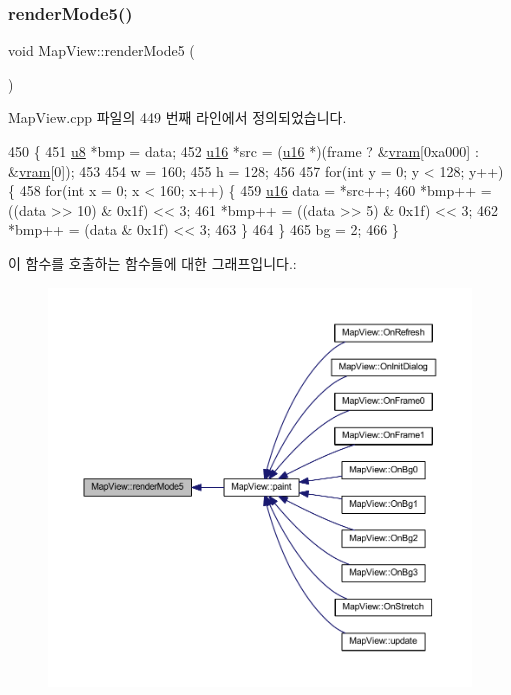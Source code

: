 \mbox{\label{class_map_view_a8f6282ba1ec4a295b2fb33a41e541ba1}} 
\subsubsection{\texorpdfstring{render\+Mode5()}{renderMode5()}}
{\footnotesize\ttfamily void Map\+View\+::render\+Mode5 (\begin{DoxyParamCaption}{ }\end{DoxyParamCaption})}



Map\+View.\+cpp 파일의 449 번째 라인에서 정의되었습니다.


\begin{DoxyCode}
450 \{
451   \mbox{\hyperlink{_system_8h_aed742c436da53c1080638ce6ef7d13de}{u8}} *bmp = data;
452   \mbox{\hyperlink{_system_8h_a9e6c91d77e24643b888dbd1a1a590054}{u16}} *src = (\mbox{\hyperlink{_system_8h_a9e6c91d77e24643b888dbd1a1a590054}{u16}} *)(frame ? &\mbox{\hyperlink{_globals_8cpp_a983f8cd19ae66ea98e180c2e13bee5b9}{vram}}[0xa000] : &\mbox{\hyperlink{_globals_8cpp_a983f8cd19ae66ea98e180c2e13bee5b9}{vram}}[0]);
453 
454   w = 160;
455   h = 128;
456   
457   \textcolor{keywordflow}{for}(\textcolor{keywordtype}{int} y = 0; y < 128; y++) \{
458     \textcolor{keywordflow}{for}(\textcolor{keywordtype}{int} x = 0; x < 160; x++) \{
459       \mbox{\hyperlink{_system_8h_a9e6c91d77e24643b888dbd1a1a590054}{u16}} data = *src++;
460       *bmp++ = ((data >> 10) & 0x1f) << 3;
461       *bmp++ = ((data >> 5) & 0x1f) << 3;
462       *bmp++ = (data & 0x1f) << 3;      
463     \}
464   \}
465   bg = 2;
466 \}
\end{DoxyCode}
이 함수를 호출하는 함수들에 대한 그래프입니다.\+:
\nopagebreak
\begin{figure}[H]
\begin{center}
\leavevmode
\includegraphics[width=350pt]{class_map_view_a8f6282ba1ec4a295b2fb33a41e541ba1_icgraph}
\end{center}
\end{figure}
